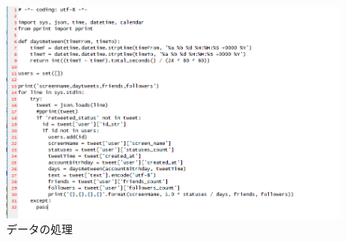 \begin{figure}[h]
\centering
\includegraphics[width=13cm]{bun1.png}
\caption{データの処理}\label{ツイートの処理}
\end{figure}

\newpage

